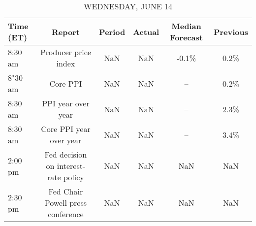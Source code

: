 \documentclass{article}%
\begin{document}
\begin{table}[htbp]%
\caption{WEDNESDAY, JUNE 14}%
\centering%
\begin{adjustbox}{width=1\textwidth}%
\begin{tabular}{lccccc}
\toprule
Time (ET) &                               Report & Period & Actual & Median Forecast & Previous \\
\midrule
  8:30 am &                 Producer price index &    NaN &    NaN &           -0.1\% &     0.2\% \\
  8"30 am &                             Core PPI &    NaN &    NaN &              -- &     0.2\% \\
  8:30 am &                   PPI year over year &    NaN &    NaN &              -- &     2.3\% \\
  8:30 am &              Core PPI year over year &    NaN &    NaN &              -- &     3.4\% \\
  2:00 pm & Fed decision on interest-rate policy &    NaN &    NaN &             NaN &      NaN \\
  2:30 pm &    Fed Chair Powell press conference &    NaN &    NaN &             NaN &      NaN \\
\bottomrule
\end{tabular}
%
\end{adjustbox}%
\end{table}

%
\end{document}
